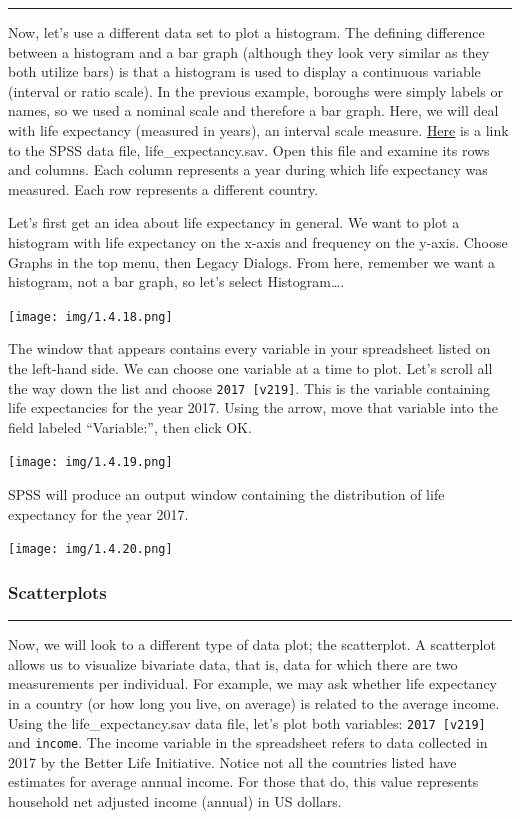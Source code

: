 \documentclass[]{book}
\begin{document}
\begin{center}\rule{0.5\linewidth}{0.5pt}\end{center}

Now, let's use a different data set to plot a histogram. The defining
difference between a histogram and a bar graph (although they look very
similar as they both utilize bars) is that a histogram is used to
display a continuous variable (interval or ratio scale). In the previous
example, boroughs were simply labels or names, so we used a nominal
scale and therefore a bar graph. Here, we will deal with life expectancy
(measured in years), an interval scale measure.
\href{https://github.com/CrumpLab/statisticsLab/blob/master/data/spssdata/life_expectancy.sav}{Here}
is a link to the SPSS data file, life\_expectancy.sav. Open this file
and examine its rows and columns. Each column represents a year during
which life expectancy was measured. Each row represents a different
country.

Let's first get an idea about life expectancy in general. We want to
plot a histogram with life expectancy on the x-axis and frequency on the
y-axis. Choose {Graphs} in the top menu, then {Legacy Dialogs}. From
here, remember we want a histogram, not a bar graph, so let's select
{Histogram\ldots{}}.

\texttt{[image: img/1.4.18.png]}

The window that appears contains every variable in your spreadsheet
listed on the left-hand side. We can choose one variable at a time to
plot. Let's scroll all the way down the list and choose
\texttt{2017\ {[}v219{]}}. This is the variable containing life
expectancies for the year 2017. Using the arrow, move that variable into
the field labeled ``Variable:'', then click {OK}.

\texttt{[image: img/1.4.19.png]}

SPSS will produce an output window containing the distribution of life
expectancy for the year 2017.

\texttt{[image: img/1.4.20.png]}

\subsubsection{Scatterplots}\label{scatterplots}

\begin{center}\rule{0.5\linewidth}{0.5pt}\end{center}

Now, we will look to a different type of data plot; the scatterplot. A
scatterplot allows us to visualize bivariate data, that is, data for
which there are two measurements per individual. For example, we may ask
whether life expectancy in a country (or how long you live, on average)
is related to the average income. Using the life\_expectancy.sav data
file, let's plot both variables: \texttt{2017\ {[}v219{]}} and
\texttt{income}. The income variable in the spreadsheet refers to data
collected in 2017 by the Better Life Initiative. Notice not all the
countries listed have estimates for average annual income. For those
that do, this value represents household net adjusted income (annual) in
US dollars.
\end{document}
